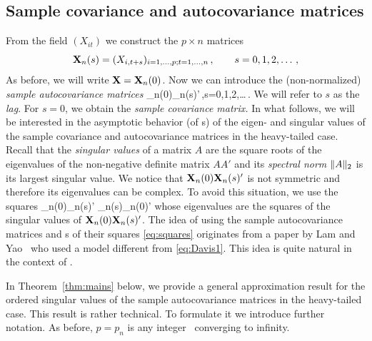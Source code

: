 \subsection{Sample covariance and autocovariance matrices}
From the field $(X_{it})$ we construct the $p\times n$ matrices
\begin{equation}\label{eq:26}
{\mathbf X}_n(s)= (X_{i,t+s})_{i=1,\ldots,p;t=1,\ldots,n}\,,\qquad s=0,1,2,\ldots\,,
\end{equation}
As before, we will write ${\mathbf X}={\mathbf X}_n(0)$.
Now we can introduce the (non-normalized)
{\em sample autocovariance matrices}
\beam\label{eq:sample}
\X_n(0)\X_n(s)'\,,\qquad s=0,1,2,\ldots\,.
\eeam
We will refer to $s$ as the {\em lag}. For $s=0$, we obtain the {\em sample covariance matrix.}
In what follows, we will be interested in the asymptotic behavior (of \fct s) of the eigen- and singular values of the
sample covariance and autocovariance matrices in the heavy-tailed case. Recall that the {\em singular values} of a matrix $A$ are the square roots of the
eigenvalues of the non-negative definite matrix $AA'$ and its {\em spectral norm} $\|A\|_2$ is its largest singular value. We notice that ${\mathbf X}_n(0){\mathbf X}_n(s)'$ is not symmetric
and therefore its eigenvalues can be complex. To avoid this situation, we use
the squares
\beam\label{eq:squares}
\X_n(0)\X_n(s)' \X_n(s)\X_n(0)'
\eeam
whose eigenvalues are the squares of the singular values of ${\mathbf X}_n(0){\mathbf X}_n(s)'$.
The idea of using the sample autocovariance matrices and \fct s of their squares \eqref{eq:squares}
originates from a paper by Lam and Yao~\cite{lam:yao:2012} who used a model different from \eqref{eq:Davis1}.
This idea is quite natural in the context of \tsa .
\par
In Theorem~\ref{thm:mains} below, we provide a general approximation result for the ordered singular values of the sample
autocovariance matrices in the heavy-tailed case. This result is rather technical. To formulate it we introduce further notation.
As before, $p=p_n$ is any integer \seq\ converging to infinity.
